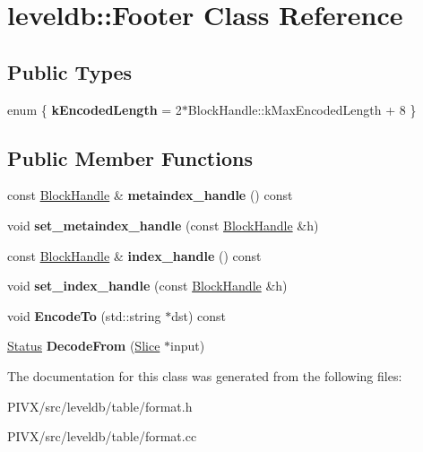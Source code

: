 \hypertarget{classleveldb_1_1_footer}{}\section{leveldb\+:\+:Footer Class Reference}
\label{classleveldb_1_1_footer}
\subsection*{Public Types}
\begin{DoxyCompactItemize}
\item 
\mbox{\label{classleveldb_1_1_footer_abc42aed79d524b414252b50e36f5d4da}} 
enum \{ {\bfseries k\+Encoded\+Length} = 2$\ast$\+Block\+Handle\+:\+:k\+Max\+Encoded\+Length + 8
 \}
\end{DoxyCompactItemize}
\subsection*{Public Member Functions}
\begin{DoxyCompactItemize}
\item 
\mbox{\label{classleveldb_1_1_footer_a996dd331d9c58d855522f990fbbf4ae1}} 
const \mbox{\hyperlink{classleveldb_1_1_block_handle}{Block\+Handle}} \& {\bfseries metaindex\+\_\+handle} () const
\item 
\mbox{\label{classleveldb_1_1_footer_ac937207010f61550c703b2d732422566}} 
void {\bfseries set\+\_\+metaindex\+\_\+handle} (const \mbox{\hyperlink{classleveldb_1_1_block_handle}{Block\+Handle}} \&h)
\item 
\mbox{\label{classleveldb_1_1_footer_a4e7e2baf2b79fe2b6d15d147a8bae57a}} 
const \mbox{\hyperlink{classleveldb_1_1_block_handle}{Block\+Handle}} \& {\bfseries index\+\_\+handle} () const
\item 
\mbox{\label{classleveldb_1_1_footer_ae2f4be5947f5e4983a160d6d01edea68}} 
void {\bfseries set\+\_\+index\+\_\+handle} (const \mbox{\hyperlink{classleveldb_1_1_block_handle}{Block\+Handle}} \&h)
\item 
\mbox{\label{classleveldb_1_1_footer_a13267dee115f0281a5a5b405714d3948}} 
void {\bfseries Encode\+To} (std\+::string $\ast$dst) const
\item 
\mbox{\label{classleveldb_1_1_footer_a3cbcb311694e4cf410358f97d53d94e3}} 
\mbox{\hyperlink{classleveldb_1_1_status}{Status}} {\bfseries Decode\+From} (\mbox{\hyperlink{classleveldb_1_1_slice}{Slice}} $\ast$input)
\end{DoxyCompactItemize}


The documentation for this class was generated from the following files\+:\begin{DoxyCompactItemize}
\item 
P\+I\+V\+X/src/leveldb/table/format.\+h\item 
P\+I\+V\+X/src/leveldb/table/format.\+cc\end{DoxyCompactItemize}

